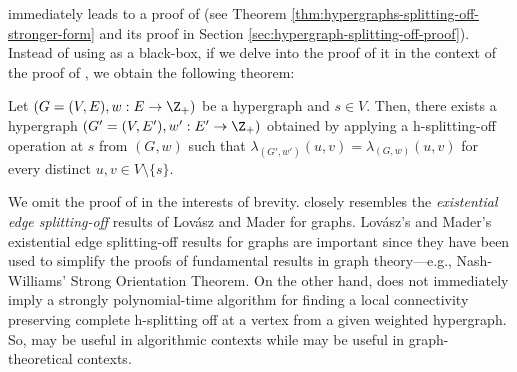  immediately leads to  a proof of  (see Theorem \ref{thm:hypergraphs-splitting-off-stronger-form} and its proof in Section \ref{sec:hypergraph-splitting-off-proof}). Instead of using  as a black-box, if we delve into the proof of it in the context of the proof of , we obtain the following theorem: 

\begin{theorem}\label{thm:splitting-off-or-trim-to-preserve-connectivity}
    Let $(G=(V, E), w: E\rightarrow \Z_+)$ be a hypergraph and $s\in V$. Then, there exists a hypergraph $(G'=(V, E'), w': E'\rightarrow \Z_+)$ obtained 
    by applying a h-splitting-off operation at $s$ from $(G, w)$ 
    such that $\lambda_{(G', w')}(u, v)=\lambda_{(G, w)}(u, v)$ for every distinct $u, v\in V\setminus \{s\}$. 
\end{theorem}
We omit the proof of  in the interests of brevity. 
 closely resembles the \emph{existential edge splitting-off} results of Lov\'{a}sz \cite{Lov74, Lovasz-problems-book} and Mader \cite{Mad78} for graphs. Lov\'{a}sz's and Mader's  existential edge splitting-off results for graphs are important since they have been used to simplify the proofs of fundamental results in graph theory---e.g., Nash-Williams' Strong Orientation Theorem. 
On the other hand,  does not immediately imply a strongly polynomial-time algorithm for finding a local connectivity preserving complete h-splitting off at a vertex from a given weighted hypergraph. So,  may be useful in algorithmic contexts while  may be useful in graph-theoretical contexts. 


